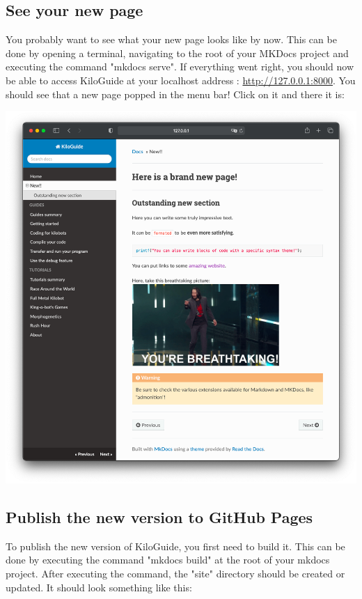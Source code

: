 \documentclass[a4paper,12pt,titlepage]{scrartcl}
\begin{document}
\subsection{See your new page}

You probably want to see what your new page looks like by now. This can be done by opening a terminal, navigating to the root of your MKDocs project and executing the command "mkdocs serve". If everything went right, you should now be able to access KiloGuide at your localhost address : \href{http://127.0.0.1:8000}{http://127.0.0.1:8000}. You should see that a new page popped in the menu bar! Click on it and there it is:

\begin{center}
    \includegraphics[scale=0.4]{new-page.png}
\end{center}

\subsection{Publish the new version to GitHub Pages}

To publish the new version of KiloGuide, you first need to build it. This can be done by executing the command "mkdocs build" at the root of your mkdocs project. After executing the command, the "site" directory should be created or updated. It should look something like this:
\end{document}
